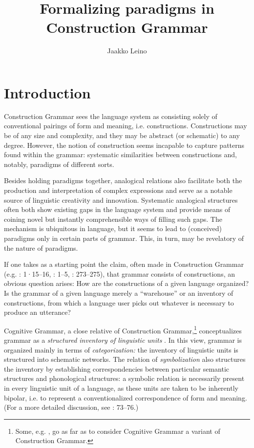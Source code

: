 \documentclass[output=paper, colorlinks,citecolor=brown]{langsci/langscibook}
\author{Jaakko Leino \affiliation{University of Helsinki}}
\title{Formalizing paradigms in Construction Grammar}
\begin{document}
\maketitle 

\section{Introduction} \label{leino_sec1}

Construction Grammar sees the language system as consisting solely of conventional pairings of form and meaning, i.e. constructions. Constructions may be of any size and complexity, and they may be abstract (or schematic) to any degree. However, the notion of construction seems incapable to capture patterns found within the grammar: systematic similarities between constructions and, notably, paradigms of different sorts.

Besides holding paradigms together, analogical relations also facilitate both the production and interpretation of complex expressions and serve as a notable source of linguistic creativity and innovation. Systematic analogical structures often both show existing gaps in the language system and provide means of coining novel but instantly comprehensible ways of filling such gaps. The mechanism is ubiquitous in language, but it seems to lead to (conceived) paradigms only in certain parts of grammar. This, in turn, may be revelatory of the nature of paradigms.

If one takes as a starting point the claim, often made in Construction Grammar (e.g. \citealt{FillmoreKay1995}: 1·15–16, \citealt{Goldberg1995}: 1–5, \citealt{Croft2005}: 273–275), that grammar consists of constructions, an obvious question arises: How are the constructions of a given language organized? Is the grammar of a given language merely a “warehouse” or an inventory of constructions, from which a language user picks out whatever is necessary to produce an utterance?

Cognitive Grammar, a close relative of Construction Grammar,\footnote{Some, e.g. \citet{Goldberg2006}, go as far as to consider Cognitive Grammar a variant of Construction Grammar.} conceptualizes grammar as a \textit{structured inventory of linguistic units} \citep[73]{Langacker1987}. In this view, grammar is organized mainly in terms of \textit{categorization:} the inventory of linguistic units is structured into schematic networks. The relation of \textit{symbolization} also structures the inventory by establishing correspondencies between particular semantic structures and phonological structures: a symbolic relation is necessarily present in every linguistic unit of a language, as these units are taken to be inherently bipolar, i.e. to represent a conventionalized correspondence of form and meaning. (For a more detailed discussion, see \citealt{Langacker1987}: 73–76.)
\end{document}

